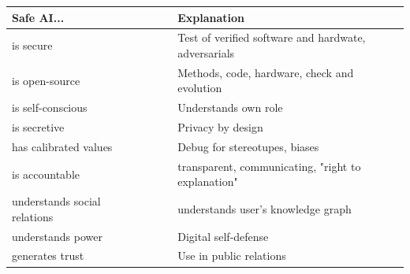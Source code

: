 \documentclass[11pt, fleqn, titlepage]{article}
\begin{document}
	
	\begin{table}[H]
		\centering
		\begin{tabular}{l  l  l  l  l}
			\toprule
			Safe AI...                  & & & & Explanation \\ \midrule
			is secure                      & & & & Test of verified software and hardwate, adversarials \\
			is open-source                 & & & & Methods, code, hardware, check and evolution         \\
			is self-conscious              & & & & Understands own role                                 \\
			is secretive                   & & & & Privacy by design                                    \\
			has calibrated values       & & & & Debug for stereotupes, biases                        \\
			is accountable              & & & & transparent, communicating, "right to explanation"   \\
			understands social relations & & & & understands user's knowledge graph                   \\
			understands power           & & & & Digital self-defense                                 \\
			generates trust             & & & & Use in public relations                              \\ \bottomrule
		\end{tabular}
	\end{table}
	
\end{document}
